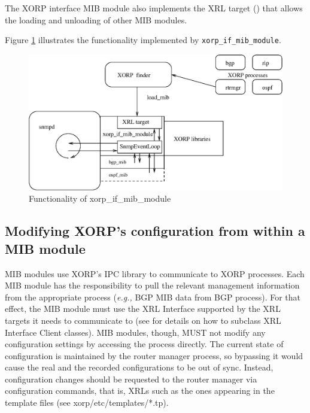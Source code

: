 \documentclass[11pt]{article}
\newcommand{\eg}{\emph{e.g.,}\xspace}
\begin{document}
The XORP interface MIB module also implements the XRL target (\cite{xorp:xrl})
that allows the loading and unloading of other MIB modules.  


Figure \ref{fig:xorp-if-diag} illustrates the functionality implemented by 
\texttt{xorp\_if\_mib\_module}.

\begin{figure}
  \begin{center}
    \includegraphics[width=1\textwidth]{figs/snmp_fig2}
  \end{center}
  \caption{Functionality of xorp\_if\_mib\_module}
  \label{fig:xorp-if-diag}
\end{figure}

\subsection{Modifying XORP's configuration from within a MIB module}

MIB modules use XORP's IPC library \cite{xorp:xrl} to communicate to XORP
processes.  Each MIB module has the responsibility to pull the relevant
management information from the appropriate process (\eg BGP MIB data from BGP
process).  For that effect, the MIB module must use the XRL Interface
supported by the XRL targets it needs to communicate to (see
\cite{xorp:xrl_interfaces} for details on how to subclass XRL Interface Client
classes).  MIB modules, though, MUST not modify any configuration settings by
accessing the process directly.  The current state of configuration is
maintained by the router manager process, so bypassing it would cause the real
and the recorded configurations to be out of sync.  Instead, configuration
changes should be requested to the router manager via configuration commands,
that is, XRLs such as the ones appearing in the template files (see
xorp/etc/templates/*.tp).
\end{document}
